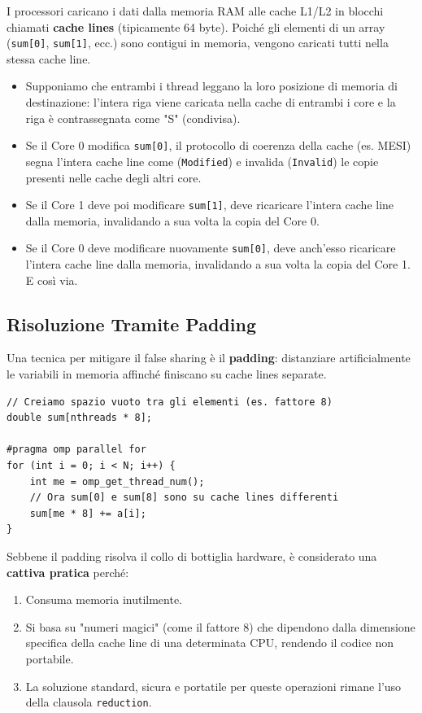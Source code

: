 \vspace{0.3cm}
\noindent
I processori caricano i dati dalla memoria RAM alle cache L1/L2 in blocchi chiamati \textbf{cache lines} (tipicamente 64 byte). Poiché gli elementi di un array (\texttt{sum[0]}, \texttt{sum[1]}, ecc.) sono contigui in memoria, vengono caricati tutti nella stessa cache line.
\begin{itemize}
    \item Supponiamo che entrambi i thread leggano la loro posizione di memoria di destinazione: l'intera riga viene caricata nella cache di entrambi i core e la riga è contrassegnata come "S" (condivisa).
    \item Se il Core 0 modifica \texttt{sum[0]}, il protocollo di coerenza della cache (es. MESI) segna l'intera cache line come (\texttt{Modified}) e invalida (\texttt{Invalid}) le copie presenti nelle cache degli altri core.
    \item Se il Core 1 deve poi modificare \texttt{sum[1]}, deve ricaricare l'intera cache line dalla memoria, invalidando a sua volta la copia del Core 0.
    \item Se il Core 0 deve modificare nuovamente \texttt{sum[0]}, deve anch'esso ricaricare l'intera cache line dalla memoria, invalidando a sua volta la copia del Core 1. E così via.
\end{itemize}

\subsection{Risoluzione Tramite Padding}
Una tecnica per mitigare il false sharing è il \textbf{padding}: distanziare artificialmente le variabili in memoria affinché finiscano su cache lines separate.

\begin{verbatim}
// Creiamo spazio vuoto tra gli elementi (es. fattore 8)
double sum[nthreads * 8]; 

#pragma omp parallel for
for (int i = 0; i < N; i++) {
    int me = omp_get_thread_num();
    // Ora sum[0] e sum[8] sono su cache lines differenti
    sum[me * 8] += a[i]; 
}
\end{verbatim}


Sebbene il padding risolva il collo di bottiglia hardware, è considerato una \textbf{cattiva pratica} perché:
\begin{enumerate}
    \item Consuma memoria inutilmente.
    \item Si basa su "numeri magici" (come il fattore 8) che dipendono dalla dimensione specifica della cache line di una determinata CPU, rendendo il codice non portabile.
    \item La soluzione standard, sicura e portatile per queste operazioni rimane l'uso della clausola \texttt{reduction}.
\end{enumerate}

